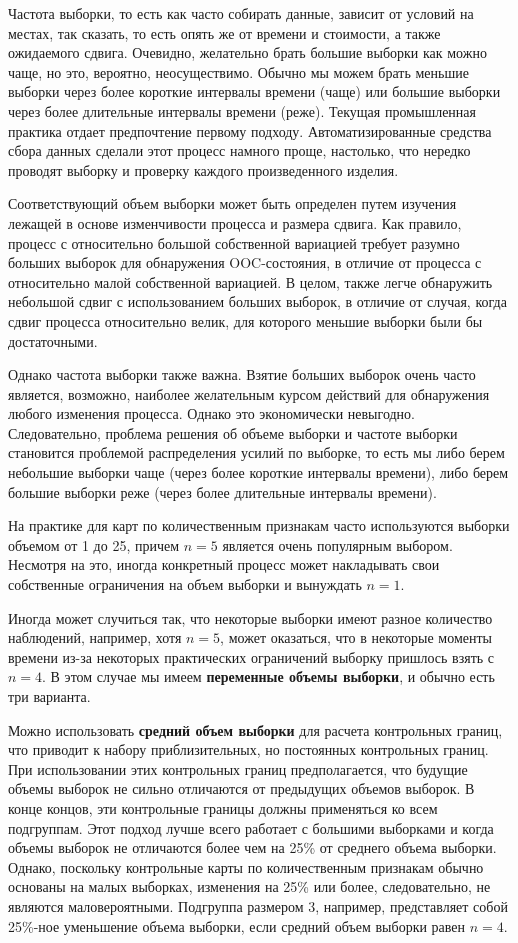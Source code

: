 Частота выборки, то есть как часто собирать данные, зависит от условий на местах, так сказать, то есть опять же от времени и стоимости, а также ожидаемого сдвига. Очевидно, желательно брать большие выборки как можно чаще, но это, вероятно, неосуществимо. Обычно мы можем брать меньшие выборки через более короткие интервалы времени (чаще) или большие выборки через более длительные интервалы времени (реже). Текущая промышленная практика отдает предпочтение первому подходу. Автоматизированные средства сбора данных сделали этот процесс намного проще, настолько, что нередко проводят выборку и проверку каждого произведенного изделия.

Соответствующий объем выборки может быть определен путем изучения лежащей в основе изменчивости процесса и размера сдвига. Как правило, процесс с относительно большой собственной вариацией требует разумно больших выборок для обнаружения OOC-состояния, в отличие от процесса с относительно малой собственной вариацией. В целом, также легче обнаружить небольшой сдвиг с использованием больших выборок, в отличие от случая, когда сдвиг процесса относительно велик, для которого меньшие выборки были бы достаточными.

Однако частота выборки также важна. Взятие больших выборок очень часто является, возможно, наиболее желательным курсом действий для обнаружения любого изменения процесса. Однако это экономически невыгодно. Следовательно, проблема решения об объеме выборки и частоте выборки становится проблемой распределения усилий по выборке, то есть мы либо берем небольшие выборки чаще (через более короткие интервалы времени), либо берем большие выборки реже (через более длительные интервалы времени).

На практике для карт по количественным признакам часто используются выборки объемом от 1 до 25, причем \(n = 5\) является очень популярным выбором. Несмотря на это, иногда конкретный процесс может накладывать свои собственные ограничения на объем выборки и вынуждать \(n = 1\).

Иногда может случиться так, что некоторые выборки имеют разное количество наблюдений, например, хотя \(n = 5\), может оказаться, что в некоторые моменты времени из-за некоторых практических ограничений выборку пришлось взять с \(n = 4\). В этом случае мы имеем \textbf{переменные объемы выборки}, и обычно есть три варианта.

Можно использовать \textbf{средний объем выборки} для расчета контрольных границ, что приводит к набору приблизительных, но постоянных контрольных границ. При использовании этих контрольных границ предполагается, что будущие объемы выборок не сильно отличаются от предыдущих объемов выборок. В конце концов, эти контрольные границы должны применяться ко всем подгруппам. Этот подход лучше всего работает с большими выборками и когда объемы выборок не отличаются более чем на 25\% от среднего объема выборки. Однако, поскольку контрольные карты по количественным признакам обычно основаны на малых выборках, изменения на 25\% или более, следовательно, не являются маловероятными. Подгруппа размером 3, например, представляет собой 25\%-ное уменьшение объема выборки, если средний объем выборки равен \(n = 4\).

